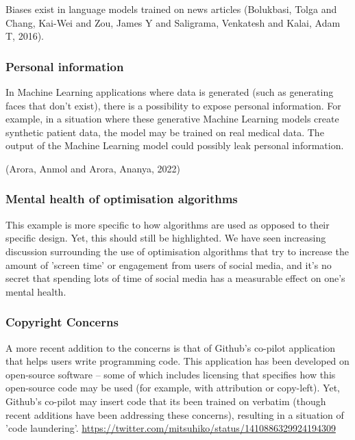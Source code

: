\documentclass[10pt]{beamer}
\begin{document}
Biases exist in language models trained on news articles (Bolukbasi, Tolga and Chang, Kai-Wei and Zou, James Y and Saligrama, Venkatesh and Kalai, Adam T, 2016).

\subsubsection*{Personal information}
\label{sec:orgf3cf28a}

In Machine Learning applications where data is generated (such as generating faces
that don't exist), there is a possibility to expose personal information. For
example, in a situation where these generative Machine Learning models create
synthetic patient data, the model may be trained on real medical data. The output of
the Machine Learning model could possibly leak personal information.

(Arora, Anmol and Arora, Ananya, 2022)

\subsubsection*{Mental health of optimisation algorithms}
\label{sec:orgecceb38}

This example is more specific to how algorithms are used as opposed to their specific
design. Yet, this should still be highlighted. We have seen increasing discussion
surrounding the use of optimisation algorithms that try to increase the amount of
'screen time' or engagement from users of social media, and it's no secret that
spending lots of time of social media has a measurable effect on one's mental health.

\subsubsection*{Copyright Concerns}
\label{sec:org61bb3de}
A more recent addition to the concerns is that of Github's co-pilot application that
helps users write programming code. This application has been developed on
open-source software -- some of which includes licensing that specifies how this
open-source code may be used (for example, with attribution or copy-left). Yet,
Github's co-pilot may insert code that its been trained on verbatim (though recent
additions have been addressing these concerns), resulting in a situation of 'code
laundering'. \url{https://twitter.com/mitsuhiko/status/1410886329924194309}
\end{document}
